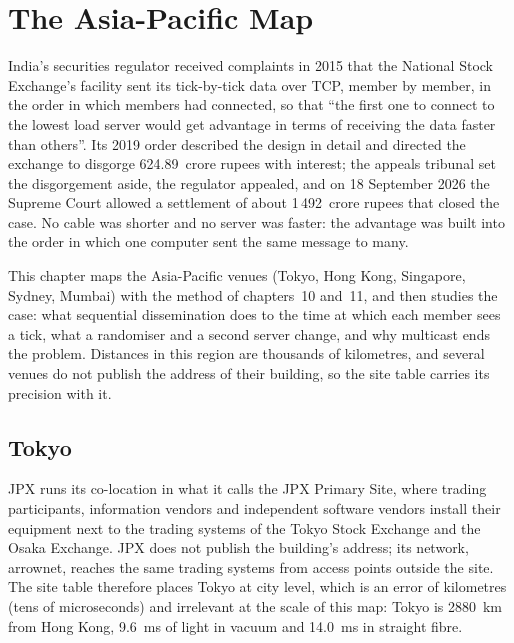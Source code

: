 \chapter{The Asia-Pacific Map}\label{ch:nw:the-asia-pacific-map}

India's securities regulator received complaints in 2015 that the National Stock Exchange's  facility sent its tick-by-tick
data over TCP, member by member, in the order in which members had connected, so that ``the first one to connect to the lowest load
server would get advantage in terms of receiving the data faster than others''. Its 2019 order described the design in detail and
directed the exchange to disgorge 624.89~crore rupees with interest; the appeals tribunal set the disgorgement aside, the regulator
appealed, and on 18 September 2026 the Supreme Court allowed a settlement of about 1\,492~crore rupees that closed the case. No cable
was shorter and no server was faster: the advantage was built into the order in which one computer sent the same message to many.

This chapter maps the Asia-Pacific venues (Tokyo, Hong Kong, Singapore, Sydney, Mumbai) with the method of chapters~10 and~11, and then
studies the case: what sequential dissemination does to the time at which each member sees a tick, what a randomiser and a second server
change, and why multicast ends the problem. Distances in this region are thousands of kilometres, and several venues do not publish the
address of their building, so the site table carries its precision with it.

\section{Tokyo}

JPX runs its co-location in what it calls the JPX Primary Site, where trading participants, information vendors and independent software
vendors install their equipment next to the trading systems of the Tokyo Stock Exchange and the Osaka Exchange. JPX does not publish the
building's address; its network, arrownet, reaches the same trading systems from access points outside the site. The site table therefore places Tokyo at city level, which is an error of kilometres (tens of microseconds)
and irrelevant at the scale of this map: Tokyo is \qty{2880}{\kilo\metre} from Hong Kong, \qty{9.6}{\milli\second} of light in vacuum and
\qty{14.0}{\milli\second} in straight fibre.

